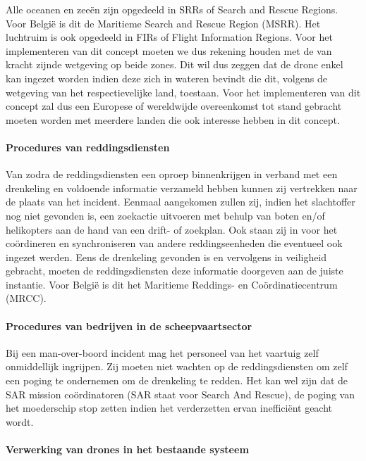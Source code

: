 Alle oceanen en zeeën zijn opgedeeld in SRRs of Search and Rescue Regions. Voor België is dit de Maritieme Search and Rescue Region (MSRR). Het luchtruim is ook opgedeeld in FIRs of Flight Information Regions. Voor het implementeren van dit concept moeten we dus rekening houden met de van kracht zijnde wetgeving op beide zones. Dit wil dus zeggen dat de drone enkel kan ingezet worden indien deze zich in wateren bevindt die dit, volgens de wetgeving van het respectievelijke land, toestaan. Voor het implementeren van dit concept zal dus een Europese of wereldwijde overeenkomst tot stand gebracht moeten worden met meerdere landen die ook interesse hebben in dit concept.   

\paragraph{Procedures van reddingsdiensten}

Van zodra de reddingsdiensten een oproep binnenkrijgen in verband met een drenkeling en voldoende informatie verzameld hebben kunnen zij vertrekken naar de plaats van het incident. Eenmaal aangekomen zullen zij, indien het slachtoffer nog niet gevonden is, een zoekactie uitvoeren met behulp van boten en/of helikopters aan de hand van een drift- of zoekplan. Ook staan zij in voor het coördineren en synchroniseren van andere reddingseenheden die eventueel ook ingezet werden. Eens de drenkeling gevonden is en vervolgens in veiligheid gebracht, moeten de reddingsdiensten deze informatie doorgeven aan de juiste instantie. Voor België is dit het Maritieme Reddings- en Coördinatiecentrum (MRCC). 

\paragraph{Procedures van bedrijven in de scheepvaartsector}

Bij een man-over-boord incident mag het personeel van het vaartuig zelf onmiddellijk ingrijpen. Zij moeten niet wachten op de reddingsdiensten om zelf een poging te ondernemen om de drenkeling te redden. Het kan wel zijn dat de SAR mission coördinatoren (SAR staat voor Search And Rescue), de poging van het moederschip stop zetten indien het verderzetten ervan inefficiënt geacht wordt.

\paragraph{Verwerking van drones in het bestaande systeem}

